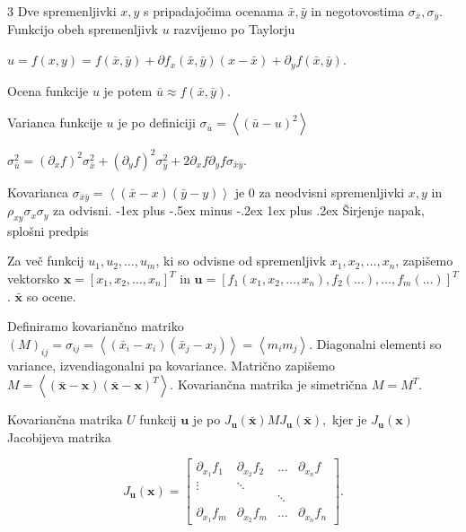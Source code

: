 \documentclass[10pt,landscape]{article}
\makeatletter
\renewcommand{\subsubsection}{\@startsection{subsubsection}{3}{0mm}%
	{-1ex plus -.5ex minus -.2ex}%
	{1ex plus .2ex}%
	{\normalfont\small\bfseries}}
\theoremstyle{definition}
\makeatother
\begin{document}
\begin{multicols}{3}
Dve spremenljivki \( x, y \) s pripadajočima ocenama \( \bar{x}, \bar{y} \) in negotovostima \( \sigma_{\bar{x}}, \sigma_{\bar{y}} \). Funkcijo obeh spremenljivk \( u \) razvijemo po Taylorju

\( u = f(x, y) = f \left( \bar{x}, \bar{y} \right) + \partial f_x \left( \bar{x}, \bar{y} \right) \left( x - \bar{x} \right) + \partial_y f \left( \bar{x}, \bar{y} \right).
\)

Ocena funkcije \( u \) je potem \( \bar{u} \approx f \left( \bar{x}, \bar{y} \right) \).

Varianca funkcije \( u \) je po definiciji \( \sigma_{\bar{u}} = \left\langle \left( \bar{u} - u \right) ^2 \right\rangle \)

\( \sigma_{\bar{u}} ^2 = \left( \partial_x f \right) ^2 \sigma_{\bar{x}} ^2 + \left( \partial_y f \right) ^2 \sigma_{\bar{y}} ^2 + 2 \partial_x f \partial_y  f \sigma_{\bar{x} \bar{y}}.
\)

Kovarianca \( \sigma_{\bar{x} \bar{y}} = \left\langle \left( \bar{x} - x \right) \left( \bar{y} - y \right) \right\rangle \) je \( 0 \) za neodvisni spremenljivki \( x, y  \) in \( \rho_{xy} \sigma_x \sigma_y \) za odvisni.
\subsubsection{Širjenje napak, splošni predpis}

Za več funkcij \( u_1, u_2, \ldots, u_m \), ki so odvisne od spremenljivk \( x_1, x_2, \ldots, x_n \), zapišemo vektorsko \( \mathbf{x} = [x_1, x_2, \ldots, x_n]^T \) in \( \mathbf{u} = [f_1 (x_1, x_2, \ldots, x_n) , f_2 (\ldots), \ldots, f_m (\ldots) ]^T \). \( \bar{\mathbf{x}} \) so ocene.

Definiramo kovariančno matriko \( \left( M \right)_{ij} = \sigma_{ij} = \left\langle \left( \bar{x}_i - x_i \right) \left( \bar{x}_j - x_j \right) \right\rangle = \left\langle m_i m_j \right\rangle \). Diagonalni elementi so variance, izvendiagonalni pa kovariance. Matrično zapišemo \( M = \left\langle \left( \bar{\mathbf{x}} - \mathbf{x} \right) \left( \bar{\mathbf{x}} - \mathbf{x} \right)^T \right\rangle \). Kovariančna matrika je simetrična \( M = M^T \).

Kovariančna matrika \( U \) funkcij \( \mathbf{u} \) je po \( J_{\mathbf{u}} \left( \bar{\mathbf{x}} \right) M J_{\mathbf{u}} \left( \bar{\mathbf{x}} \right), \) kjer je \( J_{\mathbf{u}} (\mathbf{x}) \) Jacobijeva matrika

\[ J_{\mathbf{u}} (\mathbf{x}) = \begin{bmatrix}
                                 \partial_{x_{1}}f_1 & \partial_{x_2} f_2  & \ldots & \partial_{x_n} f \\
                                 \vdots & \ddots &  &  \\
                                  &  & \ddots  &  \\
                                  \partial_{x_1} f_m & \partial_{x_2} f_m & \ldots & \partial_{x_n} f_n
                                 \end{bmatrix}.
\]


\end{multicols}
\end{document}
